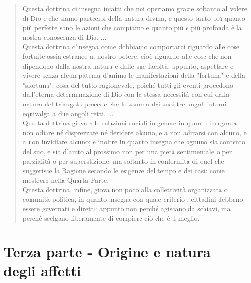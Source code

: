 \begin{quotation}
	\small Questa dottrina ci insegna infatti che noi operiamo grazie soltanto al volere di Dio e
	che siamo partecipi della natura divina, e questo tanto più quanto più perfette sono le azioni che compiamo e quanto più e più profonda è la nostra conoscenza di Dio. ...\\
	Questa dottrina c’insegna come dobbiamo comportarci riguardo alle cose fortuite ossia estranee al nostro potere, cioè riguardo alle cose che non dipendono dalla nostra natura
	e dalle sue facoltà: appunto, aspettare e vivere senza alcun patema d’animo le manifestazioni della "fortuna" e della "sfortuna": cosa del tutto ragionevole, poiché tutti gli eventi procedono dall’eterna determinazione di Dio con la stessa necessità con cui dalla natura del
	triangolo procede che la somma dei suoi tre angoli interni equivalga a due angoli retti. ...\\
	Questa dottrina giova alle relazioni sociali in genere in quanto insegna a non odiare né disprezzare né deridere alcuno, e a non adirarsi con alcuno, e a non invidiare alcuno; e
	inoltre in quanto insegna che ognuno sia contento del suo, e sia d’aiuto al prossimo non
	per una pietà sentimentale o per parzialità o per superstizione, ma soltanto in conformità
	di quel che suggerisce la Ragione secondo le esigenze del tempo e dei casi: come mostrerò
	nella Quarta Parte.\\
	Questa dottrina, infine, giova non poco alla collettività organizzata o comunità politica, in quanto insegna con quale criterio i cittadini debbano essere governati e diretti: appunto non perché agiscano da schiavi, ma perché scelgano liberamente di compiere ciò che
	è il meglio.
\end{quotation}
\newpage
\section{Terza parte - Origine e natura degli affetti}




